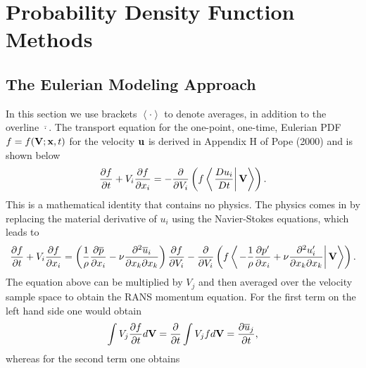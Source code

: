 \documentclass[oneside,a4paper,11pt]{report}
\newcommand{\pavg}{\overline{p}}
\newcommand{\uavg}{\overline{u}}
\newcommand{\pfluc}{p'}
\newcommand{\ufluc}{u'}
\begin{document}
%
\chapter{Probability Density Function Methods}
%

\section{The Eulerian Modeling Approach}

In this section we use brackets $\left < \cdot \right >$ to denote averages, in addition to the overline $\overline{\cdot}$. The transport equation for the one-point, one-time, Eulerian PDF $f=f(\mathbf{V} ;\mathbf{x},t)$ for the velocity $\mathbf{u}$ is derived in Appendix H of Pope (2000) and is shown below
\begin{equation}
\frac{\partial f}{\partial t} + V_i\frac{\partial f}{\partial x_i} = -\frac{\partial}{\partial V_i} \left ( f \left < \left . \frac{Du_i}{Dt} \right | \mathbf{V} \right > \right ).
\end{equation}
This is a mathematical identity that contains no physics. The physics comes in by replacing the material derivative of $u_i$ using the Navier-Stokes equations, which leads to
\begin{equation}
\label{pdf_ns}
\frac{\partial f}{\partial t} + V_i\frac{\partial f}{\partial x_i} = \left ( \frac{1}{\rho} \frac{\partial \pavg}{\partial x_i} -\nu \frac{\partial^2 \uavg_i}{\partial x_k \partial x_k} \right) \frac{\partial f}{\partial V_i} - \frac{\partial}{\partial V_i} \left ( f \left < \left . - \frac{1}{\rho} \frac{\partial \pfluc}{\partial x_i} +  \nu \frac{\partial ^2 \ufluc_i}{\partial x_k \partial x_k} \right | \Vvec \right > \right ).
\end{equation}
The equation above can be multiplied by $V_j$ and then averaged over the velocity sample space to obtain the RANS momentum equation. For the first term on the left hand side one would obtain
\begin{equation}
\int V_j \frac{\partial f}{\partial t} d\Vvec = \frac{\partial}{\partial t} \int V_j f d\Vvec = \frac{\partial \uavg_j}{\partial t},
\end{equation} 
whereas for the second term one obtains
\end{document}
